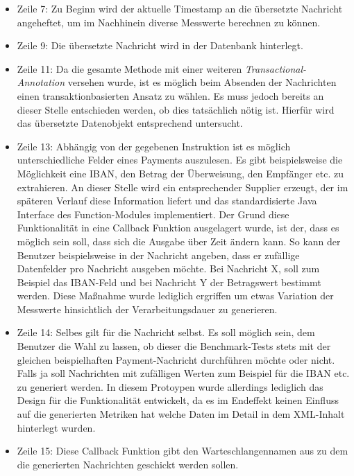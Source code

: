 \begin{itemize}
  \item Zeile 7: Zu Beginn wird der aktuelle Timestamp an die übersetzte Nachricht angeheftet, um im Nachhinein diverse Messwerte berechnen zu können.

  \item Zeile 9: Die übersetzte Nachricht wird in der Datenbank hinterlegt.

  \item Zeile 11: Da die gesamte Methode mit einer weiteren \emph{Transactional-Annotation} versehen wurde, ist es möglich beim Absenden der Nachrichten einen transaktionbasierten Ansatz zu wählen. Es muss jedoch bereits an dieser Stelle entschieden werden, ob dies tatsächlich nötig ist. Hierfür wird das übersetzte Datenobjekt entsprechend untersucht. 

  \item Zeile 13: Abhängig von der gegebenen Instruktion ist es möglich unterschiedliche Felder eines Payments auszulesen. Es gibt beispielsweise die Möglichkeit eine IBAN, den Betrag der Überweisung, den Empfänger etc. zu extrahieren. An dieser Stelle wird ein entsprechender Supplier erzeugt, der im späteren Verlauf diese Information liefert und das standardisierte Java Interface des Function-Modules implementiert. Der Grund diese Funktionalität in eine Callback Funktion ausgelagert wurde, ist der, dass es möglich sein soll, dass sich die Ausgabe über Zeit ändern kann. So kann der Benutzer beispielsweise in der Nachricht angeben, dass er zufällige Datenfelder pro Nachricht ausgeben möchte. Bei Nachricht X, soll zum Beispiel das IBAN-Feld und bei Nachricht Y der Betragswert bestimmt werden. Diese Maßnahme wurde lediglich ergriffen um etwas Variation der Messwerte hinsichtlich der Verarbeitungsdauer zu generieren.

  \item Zeile 14: Selbes gilt für die Nachricht selbst. Es soll möglich sein, dem Benutzer die Wahl zu lassen, ob dieser die Benchmark-Tests stets mit der gleichen beispielhaften Payment-Nachricht durchführen möchte oder nicht. Falls ja soll Nachrichten mit zufälligen Werten zum Beispiel für die IBAN etc. zu generiert werden. In diesem Protoypen wurde allerdings lediglich das Design für die Funktionalität entwickelt, da es im Endeffekt keinen Einfluss auf die generierten Metriken hat welche Daten im Detail in dem XML-Inhalt hinterlegt wurden.

  \item Zeile 15: Diese Callback Funktion gibt den Warteschlangennamen aus zu dem die generierten Nachrichten geschickt werden sollen.
  

\end{itemize}
